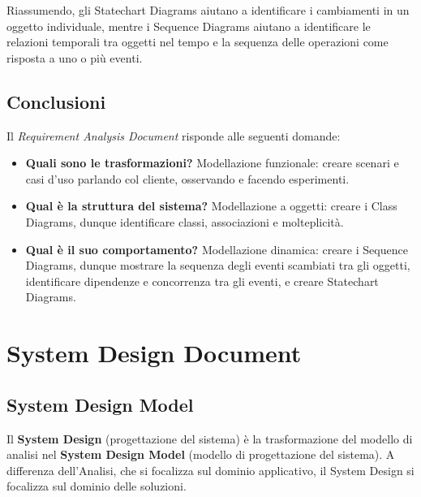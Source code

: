 \documentclass{article}
\begin{document}
        \vspace{3mm}
        
        Riassumendo, gli Statechart Diagrams aiutano a identificare i cambiamenti in un oggetto individuale, mentre i Sequence Diagrams aiutano a identificare le relazioni temporali tra oggetti nel tempo e la sequenza delle operazioni come risposta a uno o più eventi.
        
    \subsection{Conclusioni}
        
        Il \textit{Requirement Analysis Document} risponde alle seguenti domande:
        
        \begin{itemize}
            \item \textbf{Quali sono le trasformazioni?} Modellazione funzionale: creare scenari e casi d’uso parlando col cliente, osservando e facendo esperimenti.
            
            \item \textbf{Qual è la struttura del sistema?} Modellazione a oggetti: creare i Class Diagrams, dunque identificare classi, associazioni e molteplicità.
            
            \item \textbf{Qual è il suo comportamento?} Modellazione dinamica: creare i Sequence Diagrams, dunque mostrare la sequenza degli eventi scambiati tra gli oggetti, identificare dipendenze e concorrenza tra gli eventi, e creare Statechart Diagrams.
        \end{itemize}

\section{System Design Document}

    \subsection{System Design Model}
        Il \textbf{System Design} (progettazione del sistema) è la trasformazione del modello di analisi nel \textbf{System Design Model} (modello di progettazione del sistema). A differenza dell’Analisi, che si focalizza sul dominio applicativo, il System Design si focalizza sul dominio delle soluzioni. 
        
        \vspace{3mm}
        
\end{document}
